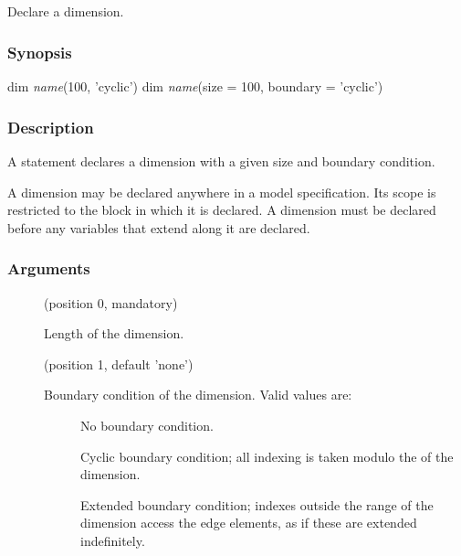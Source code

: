 \subsection{\label{dim}}

Declare a dimension.

\subsubsection*{Synopsis\label{dim_Synopsis}}
\begin{bicode}
dim \textsl{name}(100, 'cyclic')
dim \textsl{name}(size = 100, boundary = 'cyclic')
\end{bicode}

\subsubsection*{Description\label{dim_Description}}

A  statement declares a dimension with a given size and boundary
condition.

A dimension may be declared anywhere in a model
specification. Its scope is restricted to the block in which it is
declared. A dimension must be declared before any variables that
extend along it are declared.

\subsubsection*{Arguments\label{dim_Arguments}}

\begin{description}
\item[] (position 0, mandatory)

Length of the dimension.

\item[] (position 1, default 'none')

Boundary condition of the dimension. Valid values are:

\begin{description}
\item[]

No boundary condition.

\item[]

Cyclic boundary condition; all indexing is taken modulo the  of
the dimension.

\item[]

Extended boundary condition; indexes outside the range of the dimension
access the edge elements, as if these are extended indefinitely.

\end{description}
\end{description}

